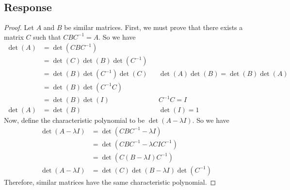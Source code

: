\documentclass[13pt]{article}
\begin{document}
    \subsection*{Response}
    \begin{proof}
      Let $A$ and $B$ be similar matrices. First, we must prove that there exists a matrix $C$ such that $CBC^{-1} = A$. So we have
      \begin{align*}
        \det(A) &= \det(CBC^{-1}) \\
                &= \det(C) \det(B) \det(C^{-1}) \\
                &= \det(B) \det(C^{-1}) \det(C) && \det(A) \det(B) = \det(B) \det(A) \\
                &= \det(B) \det(C^{-1}C) \\
                &= \det(B) \det(I) && C^{-1}C = I \\
        \det(A) &= \det(B) && \det(I) = 1
      \end{align*}
      Now, define the characteristic polynomial to be $\det(A - \lambda I)$. So we have
      \begin{align*}
        \det(A - \lambda I) &= \det(CBC^{-1} - \lambda I) \\
                            &= \det(CBC^{-1} - \lambda CIC^{-1}) \\
                            &= \det(C(B - \lambda I)C^{-1}) \\
        \det(A - \lambda I) &= \det(C) \det(B - \lambda I) \det(C^{-1})
      \end{align*}
      Therefore, similar matrices have the same characteristic polynomial.
    \end{proof}

  
\end{document}
